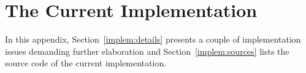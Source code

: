 
\cleardoublepage
\chapter{The Current Implementation}
\label{implem}

In this appendix, Section~\ref{implem:details} presents a couple of
implementation issues demanding further elaboration and
Section~\ref{implem:sources} lists the source code of the current
implementation.



